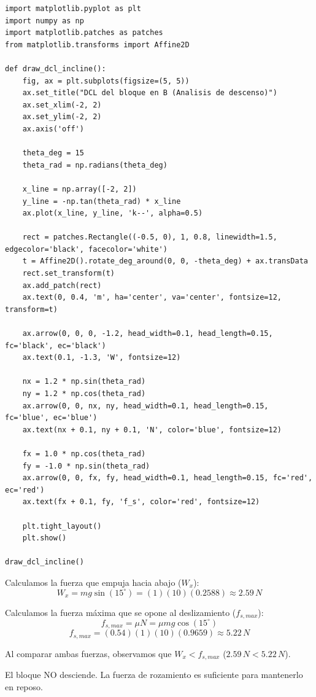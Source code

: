 \documentclass[12pt, a4paper]{article}
\begin{document}
\begin{lstlisting}
import matplotlib.pyplot as plt
import numpy as np
import matplotlib.patches as patches
from matplotlib.transforms import Affine2D

def draw_dcl_incline():
    fig, ax = plt.subplots(figsize=(5, 5))
    ax.set_title("DCL del bloque en B (Analisis de descenso)")
    ax.set_xlim(-2, 2)
    ax.set_ylim(-2, 2)
    ax.axis('off')

    theta_deg = 15
    theta_rad = np.radians(theta_deg)

    x_line = np.array([-2, 2])
    y_line = -np.tan(theta_rad) * x_line
    ax.plot(x_line, y_line, 'k--', alpha=0.5)

    rect = patches.Rectangle((-0.5, 0), 1, 0.8, linewidth=1.5, edgecolor='black', facecolor='white')
    t = Affine2D().rotate_deg_around(0, 0, -theta_deg) + ax.transData
    rect.set_transform(t)
    ax.add_patch(rect)
    ax.text(0, 0.4, 'm', ha='center', va='center', fontsize=12, transform=t)

    ax.arrow(0, 0, 0, -1.2, head_width=0.1, head_length=0.15, fc='black', ec='black')
    ax.text(0.1, -1.3, 'W', fontsize=12)

    nx = 1.2 * np.sin(theta_rad)
    ny = 1.2 * np.cos(theta_rad)
    ax.arrow(0, 0, nx, ny, head_width=0.1, head_length=0.15, fc='blue', ec='blue')
    ax.text(nx + 0.1, ny + 0.1, 'N', color='blue', fontsize=12)

    fx = 1.0 * np.cos(theta_rad)
    fy = -1.0 * np.sin(theta_rad)
    ax.arrow(0, 0, fx, fy, head_width=0.1, head_length=0.15, fc='red', ec='red')
    ax.text(fx + 0.1, fy, 'f_s', color='red', fontsize=12)

    plt.tight_layout()
    plt.show()

draw_dcl_incline()
\end{lstlisting}

Calculamos la fuerza que empuja hacia abajo ($W_x$):
$$W_x = mg \sin(15^\circ) = (1)(10)(0.2588) \approx 2.59 \, \si{N}$$

Calculamos la fuerza máxima que se opone al deslizamiento ($f_{s,max}$):
$$f_{s,max} = \mu N = \mu mg \cos(15^\circ)$$
$$f_{s,max} = (0.54)(1)(10)(0.9659) \approx 5.22 \, \si{N}$$

Al comparar ambas fuerzas, observamos que $W_x < f_{s,max}$ ($2.59 \, \si{N} < 5.22 \, \si{N}$).

\begin{tcolorbox}[colback=green!5!white, colframe=green!50!black, title=Respuesta Final]
\centering \Large El bloque NO desciende. La fuerza de rozamiento es suficiente para mantenerlo en reposo.
\end{tcolorbox}
\end{document}
